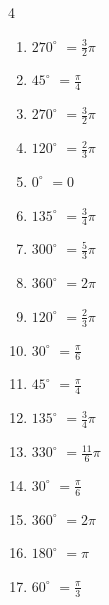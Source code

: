\begin{multicols}{4}
\begin{enumerate}
  \item $\displaystyle 270^{\circ}$
        $\displaystyle =\frac{3}{2}\pi$

  \item $\displaystyle 45^{\circ}$
        $\displaystyle =\frac{\pi}{4}$

  \item $\displaystyle 270^{\circ}$
        $\displaystyle =\frac{3}{2}\pi$

  \item $\displaystyle 120^{\circ}$
        $\displaystyle =\frac{2}{3}\pi$

  \item $\displaystyle 0^{\circ}$
        $\displaystyle =0$

\columnbreak %

  \item $\displaystyle 135^{\circ}$
        $\displaystyle =\frac{3}{4}\pi$

  \item $\displaystyle 300^{\circ}$
        $\displaystyle =\frac{5}{3}\pi$

  \item $\displaystyle 360^{\circ}$
        $\displaystyle =2\pi$

  \item $\displaystyle 120^{\circ}$
        $\displaystyle =\frac{2}{3}\pi$

  \item $\displaystyle 30^{\circ}$
        $\displaystyle =\frac{\pi}{6}$

  \item $\displaystyle 45^{\circ}$
        $\displaystyle =\frac{\pi}{4}$

  \item $\displaystyle 135^{\circ}$
        $\displaystyle =\frac{3}{4}\pi$

  \item $\displaystyle 330^{\circ}$
        $\displaystyle =\frac{11}{6}\pi$

  \item $\displaystyle 30^{\circ}$
        $\displaystyle =\frac{\pi}{6}$

  \item $\displaystyle 360^{\circ}$
        $\displaystyle =2\pi$

  \item $\displaystyle 180^{\circ}$
        $\displaystyle =\pi$

  \item $\displaystyle 60^{\circ}$
        $\displaystyle =\frac{\pi}{3}$


\end{enumerate}
\end{multicols}
